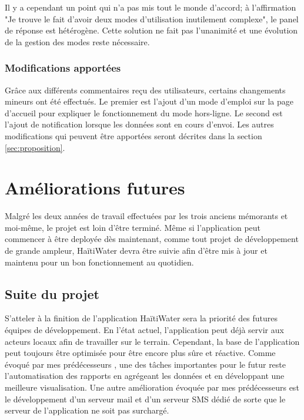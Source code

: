 \documentclass{EPL-master-thesis-covers-FR}
\begin{document}
				Il y a cependant un point qui n'a pas mis tout le monde d'accord; à l'affirmation "Je trouve le fait d'avoir deux modes d'utilisation inutilement complexe", le panel de réponse est hétérogène. Cette solution ne fait pas l'unanimité et une évolution de la gestion des modes reste nécessaire.
		
			\subsection*{Modifications apportées}
				Grâce aux différents commentaires reçu des utilisateurs, certains changements mineurs ont été effectués. Le premier est l'ajout d'un mode d'emploi sur la page d'accueil pour expliquer le fonctionnement du mode hors-ligne.
				Le second est l'ajout de notification lorsque les données sont en cours d'envoi. 
				Les autres modifications qui peuvent être apportées seront décrites dans la section \ref{sec:proposition}.
				
				

	\chapter{Améliorations futures}
		Malgré les deux années de travail effectuées par les trois anciens mémorants \cite{ref:haitiwater} et moi-même, le projet est loin d'être terminé. Même si l'application peut commencer à être deployée dès maintenant, comme tout projet de développement de grande ampleur, HaïtiWater devra être suivie afin d'être mis à jour et maintenu pour un bon fonctionnement au quotidien. 

		\section{Suite du projet}
			\label{ref:suite_projet}
			S'atteler à la finition de l'application HaïtiWater sera la priorité des futures équipes de développement. En l'état actuel, l'application peut déjà servir aux acteurs locaux afin de travailler sur le terrain. Cependant, la base de l'application peut toujours être optimisée pour être encore plus sûre et réactive.		
			Comme évoqué par mes prédécesseurs \cite{ref:haitiwater}, une des tâches importantes pour le futur reste l'automatisation des rapports en agrégeant les données et en développant une meilleure visualisation. Une autre amélioration évoquée par mes prédécesseurs est le développement d'un serveur mail et d'un serveur SMS dédié de sorte que le serveur de l'application ne soit pas surchargé.
			
\end{document}
